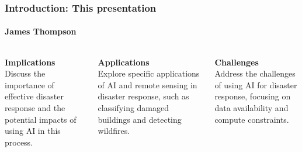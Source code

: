 \documentclass{beamer}
\newcommand{\namedframe}[3]{
  \begin{frame}
    \frametitle{#2}
    \framesubtitle{#1}
    #3
  \end{frame}
}
\begin{document}
\namedframe{James Thompson}{Introduction: This presentation}{
  \begin{columns}[T,totalwidth=\textwidth]
    \begin{column}{0.32\textwidth}
      \textbf{Implications}\\
      \small Discuss the importance of effective disaster response and the potential impacts of using AI in this process.
    \end{column}
    \pause
    \begin{column}{0.32\textwidth}
      \textbf{Applications}\\
      \small Explore specific applications of AI and remote sensing in disaster response, such as classifying damaged buildings and detecting wildfires.
    \end{column}
    \pause
    \begin{column}{0.32\textwidth}
      \textbf{Challenges}\\
      \small Address the challenges of using AI for disaster response, focusing on data availability and compute constraints.
    \end{column}
  \end{columns}
}
\end{document}
